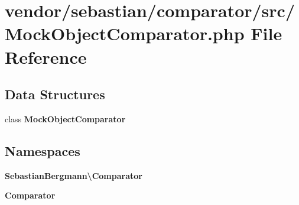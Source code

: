 \section{vendor/sebastian/comparator/src/\+Mock\+Object\+Comparator.php File Reference}
\label{_mock_object_comparator_8php}
\subsection*{Data Structures}
\begin{DoxyCompactItemize}
\item 
class {\bf Mock\+Object\+Comparator}
\end{DoxyCompactItemize}
\subsection*{Namespaces}
\begin{DoxyCompactItemize}
\item 
 {\bf Sebastian\+Bergmann\textbackslash{}\+Comparator}
\item 
 {\bf Comparator}
\end{DoxyCompactItemize}
